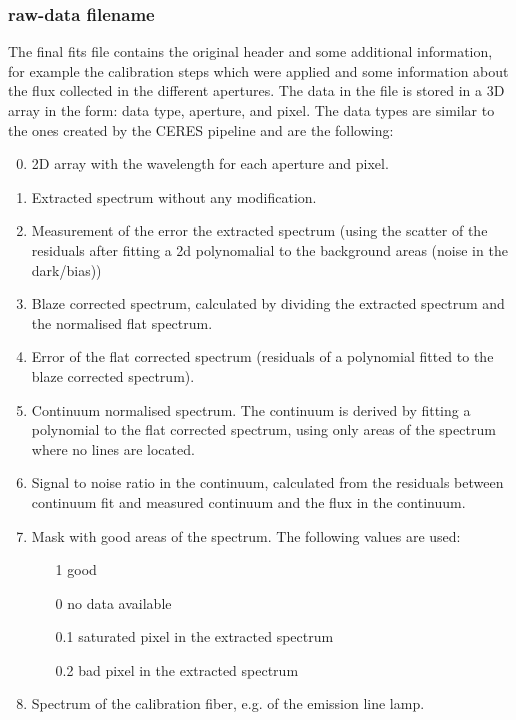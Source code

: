 \documentclass[10pt,a4paper]{article}
\begin{document}
\subsubsection{raw-data filename}
\label{section:extraction_data_format}
The final fits file contains the original header and some additional information, for example the calibration steps which were applied and some information about the flux collected in the different apertures. The data in the file is stored in a 3D array in the form: data type, aperture, and pixel. The data types are similar to the ones created by the CERES pipeline and are the following:
\begin{enumerate}
  \setcounter{enumi}{-1}
  \item 2D array with the wavelength for each aperture and pixel.
  \item Extracted spectrum without any modification.
  \item Measurement of the error the extracted spectrum (using the scatter of the residuals after fitting a 2d polynomalial to the background areas (noise in the dark/bias))
  \item Blaze corrected spectrum, calculated by dividing the extracted spectrum and the normalised flat spectrum.
  \item Error of the flat corrected spectrum (residuals of a polynomial fitted to the blaze corrected spectrum).
  \item Continuum normalised spectrum. The continuum is derived by fitting a polynomial to the flat corrected spectrum, using only areas of the spectrum where no lines are located. 
  \item Signal to noise ratio in the continuum, calculated from the residuals between continuum fit and measured continuum and the flux in the continuum.
  \item Mask with good areas of the spectrum. The following values are used:
  \begin{itemize}
    \item[1] good
    \item[0] no data available
    \item[0.1] saturated pixel in the extracted spectrum
    \item[0.2] bad pixel in the extracted spectrum
  \end{itemize}
  \item Spectrum of the calibration fiber, e.g. of the emission line lamp.
\end{enumerate}
\end{document}
